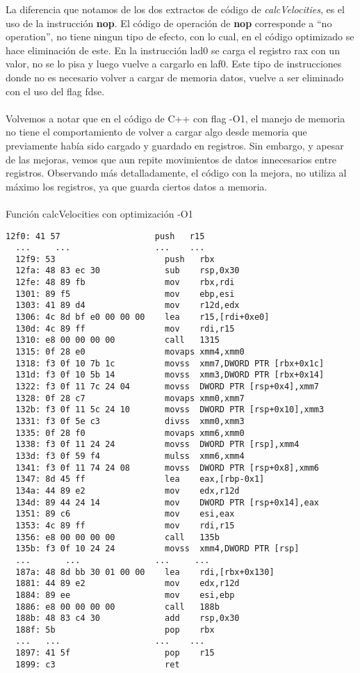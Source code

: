 La diferencia que notamos de los dos extractos de código de \textit{calcVelocities}, es el uso de la instrucción \textbf{nop}. El código de operación de \textbf{nop} corresponde a ``no operation'', no tiene ningun tipo de efecto, con lo cual, en el código optimizado se hace eliminación de este.
En la instrucción lad0 se carga el registro rax con un valor, no se lo pisa y luego vuelve a cargarlo en laf0. Este tipo de instrucciones donde no es necesario volver a cargar de memoria datos, vuelve a ser eliminado con el uso del flag fdse.
~\\
~\\
Volvemos a notar que en el código de C++ con flag -O1, el manejo de memoria no tiene el comportamiento de volver a cargar algo desde memoria que previamente había sido cargado y guardado en registros. Sin embargo, y apesar de las mejoras, vemos que aun repite movimientos de datos innecesarios entre registros.
Observando más detalladamente, el código con la mejora, no utiliza al máximo los registros, ya que guarda ciertos datos a memoria.
~\\
~\\
{\center\large{Función calcVelocities con optimización -O1}}
\begin{lstlisting}[]
  12f0:	41 57                	push   r15
  ...     ...                 ...    ...
  12f9:	53                   	push   rbx
  12fa:	48 83 ec 30          	sub    rsp,0x30
  12fe:	48 89 fb             	mov    rbx,rdi
  1301:	89 f5                	mov    ebp,esi
  1303:	41 89 d4             	mov    r12d,edx
  1306:	4c 8d bf e0 00 00 00 	lea    r15,[rdi+0xe0]
  130d:	4c 89 ff             	mov    rdi,r15
  1310:	e8 00 00 00 00       	call   1315
  1315:	0f 28 e0             	movaps xmm4,xmm0
  1318:	f3 0f 10 7b 1c       	movss  xmm7,DWORD PTR [rbx+0x1c]
  131d:	f3 0f 10 5b 14       	movss  xmm3,DWORD PTR [rbx+0x14]
  1322:	f3 0f 11 7c 24 04    	movss  DWORD PTR [rsp+0x4],xmm7
  1328:	0f 28 c7             	movaps xmm0,xmm7
  132b:	f3 0f 11 5c 24 10    	movss  DWORD PTR [rsp+0x10],xmm3
  1331:	f3 0f 5e c3          	divss  xmm0,xmm3
  1335:	0f 28 f0             	movaps xmm6,xmm0
  1338:	f3 0f 11 24 24       	movss  DWORD PTR [rsp],xmm4
  133d:	f3 0f 59 f4          	mulss  xmm6,xmm4
  1341:	f3 0f 11 74 24 08    	movss  DWORD PTR [rsp+0x8],xmm6
  1347:	8d 45 ff             	lea    eax,[rbp-0x1]
  134a:	44 89 e2             	mov    edx,r12d
  134d:	89 44 24 14          	mov    DWORD PTR [rsp+0x14],eax
  1351:	89 c6                	mov    esi,eax
  1353:	4c 89 ff             	mov    rdi,r15
  1356:	e8 00 00 00 00       	call   135b
  135b:	f3 0f 10 24 24       	movss  xmm4,DWORD PTR [rsp]
  ...       ...               ...     ...
  187a:	48 8d bb 30 01 00 00 	lea    rdi,[rbx+0x130]
  1881:	44 89 e2             	mov    edx,r12d
  1884:	89 ee                	mov    esi,ebp
  1886:	e8 00 00 00 00       	call   188b 
  188b:	48 83 c4 30          	add    rsp,0x30
  188f:	5b                   	pop    rbx
  ...   ...                   ...    ...
  1897:	41 5f                	pop    r15
  1899:	c3                   	ret 
\end{lstlisting}


